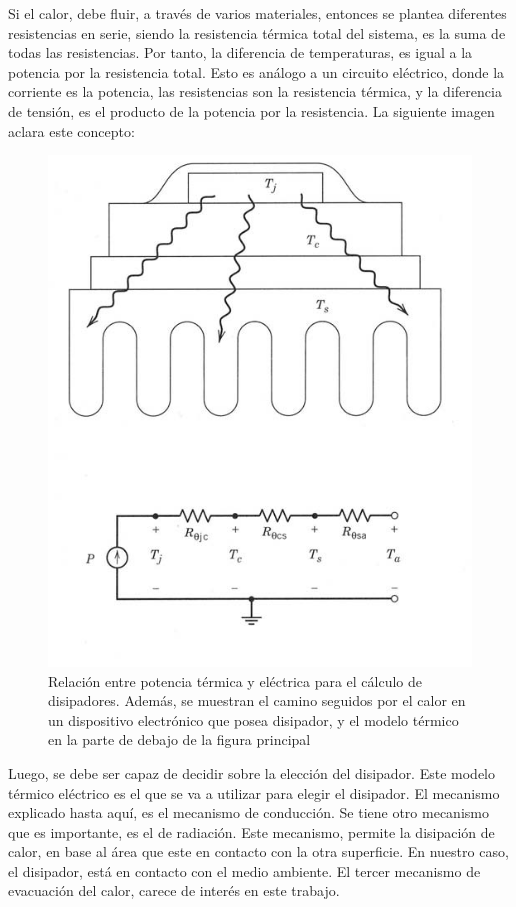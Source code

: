 Si el calor, debe fluir, a través de varios materiales, entonces se plantea diferentes resistencias en serie, siendo la resistencia térmica total del sistema, es la suma de todas las resistencias. Por tanto, la diferencia de temperaturas, es igual a la potencia por la resistencia total. Esto es análogo a un circuito eléctrico, donde la corriente es la potencia, las resistencias son la resistencia térmica, y la diferencia de tensión, es el producto de la potencia por la resistencia. La siguiente imagen aclara este concepto:

\begin{figure}[ht!]
	\centering
	\includegraphics[scale=0.4]{modelo_termico_general}
	\caption{Relación entre potencia térmica y eléctrica para el cálculo de disipadores. Además, se muestran el camino seguidos por el calor en un dispositivo electrónico que posea disipador, y el modelo térmico en la parte de debajo de la figura principal}
	\label{fig:modelo_termico_disip}
\end{figure}

Luego, se debe ser capaz de decidir sobre la elección del disipador. Este modelo térmico eléctrico es el que se va a utilizar para elegir el disipador. El mecanismo explicado hasta aquí, es el mecanismo de conducción. Se tiene otro mecanismo que es importante, es el de radiación. Este mecanismo, permite la disipación de calor, en base al área que este en contacto con la otra superficie. En nuestro caso, el disipador, está en contacto con el medio ambiente. El tercer mecanismo de evacuación del calor, carece de interés en este trabajo.

